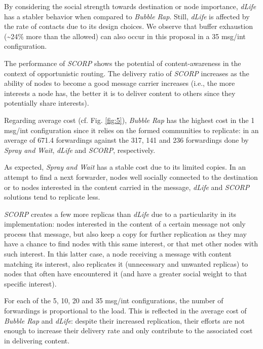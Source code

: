 \documentclass[lnicst]{svmultln}
\begin{document}
By considering the social strength towards destination or node importance,
\emph{dLife} has a stabler behavior when compared to \emph{Bubble
Rap}. Still, \emph{dLife} is affected by the rate of contacts due
to its design choices. We observe that buffer exhaustion (\textasciitilde{}24\%
more than the allowed) can also occur in this proposal in a 35 msg/int
configuration.

The performance of \emph{SCORP} shows the potential of content-awareness
in the context of opportunistic routing. The delivery ratio of \emph{SCORP}
increases as the ability of nodes to become a good message carrier
increases (i.e., the more interests a node has, the better it is to
deliver content to others since they potentially share interests). 

Regarding average cost (cf. Fig. \ref{fig:5}), \emph{Bubble Rap}
has the highest cost in the 1 msg/int configuration since it relies
on the formed communities to replicate: in an average of 671.4 forwardings
against the 317, 141 and 236 forwardings done by \emph{Spray and Wait},
\emph{dLife} and \emph{SCORP}, respectively. 

As expected, \emph{Spray and Wait }has a stable cost due to its limited
copies. In an attempt to find a next forwarder, nodes well socially
connected to the destination or to nodes interested in the content
carried in the message, \emph{dLife} and \emph{SCORP} solutions tend
to replicate less. 

\emph{SCORP} creates a few more replicas than \emph{dLife} due to
a particularity in its implementation: nodes interested in the content
of a certain message not only process that message, but also keep
a copy for further replication as they may have a chance to find nodes
with this same interest, or that met other nodes with such interest.
In this latter case, a node receiving a message with content matching
its interest, also replicates it (unnecessary and unwanted replicas)
to nodes that often have encountered it (and have a greater social
weight to that specific interest).\emph{}

For each of the 5, 10, 20 and 35 msg/int configurations, the number
of forwardings is proportional to the load. This is reflected in the
average cost of \emph{Bubble Rap }and \emph{dLife}: despite their
increased replication, their efforts are not enough to increase their
delivery rate and only contribute to the associated cost in delivering
content. 
\end{document}
